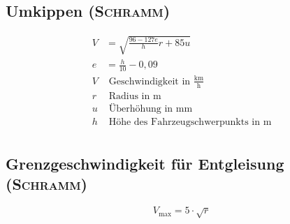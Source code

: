 \documentclass{scrartcl}
\begin{document}
	\subsection{Umkippen (\textsc{Schramm})}
	\begin{align*}
		V &= \sqrt{\frac{96-127e}{h}r+85u} \\
		e &= \frac{h}{10}-0,09 \\
		V & \text{ Geschwindigkeit in }\frac{\mathrm{km}}{\mathrm{h}} \\
		r & \text{ Radius in } \mathrm{m} \\
		u & \text{ Überhöhung in } \mathrm{mm} \\
		h & \text{ Höhe des Fahrzeugschwerpunkts in } \mathrm{m}\\
	\end{align*}

	\subsection{Grenzgeschwindigkeit für Entgleisung (\textsc{Schramm})}
	$$ V_\mathrm{max} = 5\cdot\sqrt{r} $$
\end{document}
